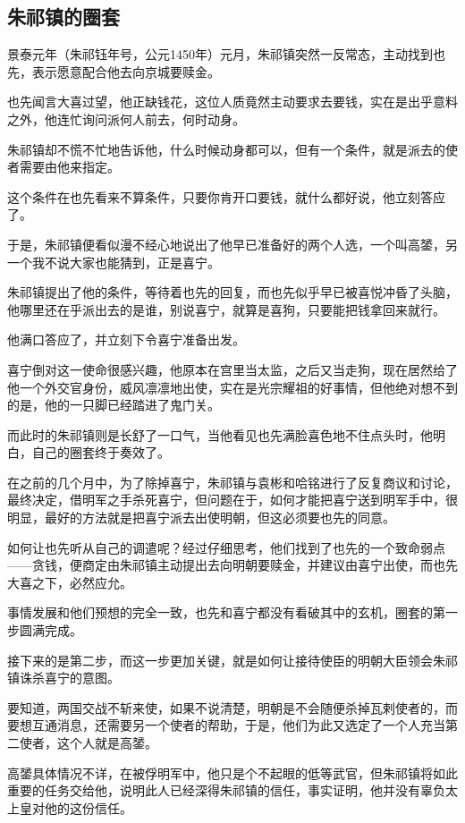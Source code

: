 \begin{multicols}{\theparacolNo}
\subsection{朱祁镇的圈套}
景泰元年（朱祁钰年号，公元1450年）元月，朱祁镇突然一反常态，主动找到也先，表示愿意配合他去向京城要赎金。

也先闻言大喜过望，他正缺钱花，这位人质竟然主动要求去要钱，实在是出乎意料之外，他连忙询问派何人前去，何时动身。

朱祁镇却不慌不忙地告诉他，什么时候动身都可以，但有一个条件，就是派去的使者需要由他来指定。

这个条件在也先看来不算条件，只要你肯开口要钱，就什么都好说，他立刻答应了。

于是，朱祁镇便看似漫不经心地说出了他早已准备好的两个人选，一个叫高𨭉，另一个我不说大家也能猜到，正是喜宁。

朱祁镇提出了他的条件，等待着也先的回复，而也先似乎早已被喜悦冲昏了头脑，他哪里还在乎派出去的是谁，别说喜宁，就算是喜狗，只要能把钱拿回来就行。

他满口答应了，并立刻下令喜宁准备出发。

喜宁倒对这一使命很感兴趣，他原本在宫里当太监，之后又当走狗，现在居然给了他一个外交官身份，威风凛凛地出使，实在是光宗耀祖的好事情，但他绝对想不到的是，他的一只脚已经踏进了鬼门关。

而此时的朱祁镇则是长舒了一口气，当他看见也先满脸喜色地不住点头时，他明白，自己的圈套终于奏效了。

在之前的几个月中，为了除掉喜宁，朱祁镇与袁彬和哈铭进行了反复商议和讨论，最终决定，借明军之手杀死喜宁，但问题在于，如何才能把喜宁送到明军手中，很明显，最好的方法就是把喜宁派去出使明朝，但这必须要也先的同意。

如何让也先听从自己的调遣呢？经过仔细思考，他们找到了也先的一个致命弱点——贪钱，便商定由朱祁镇主动提出去向明朝要赎金，并建议由喜宁出使，而也先大喜之下，必然应允。

事情发展和他们预想的完全一致，也先和喜宁都没有看破其中的玄机，圈套的第一步圆满完成。

接下来的是第二步，而这一步更加关键，就是如何让接待使臣的明朝大臣领会朱祁镇诛杀喜宁的意图。

要知道，两国交战不斩来使，如果不说清楚，明朝是不会随便杀掉瓦剌使者的，而要想互通消息，还需要另一个使者的帮助，于是，他们为此又选定了一个人充当第二使者，这个人就是高𨭉。

高𨭉具体情况不详，在被俘明军中，他只是个不起眼的低等武官，但朱祁镇将如此重要的任务交给他，说明此人已经深得朱祁镇的信任，事实证明，他并没有辜负太上皇对他的这份信任。


\end{multicols}
